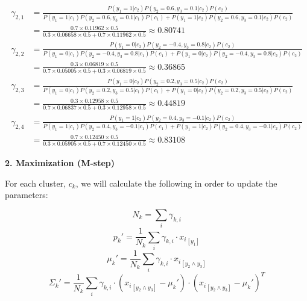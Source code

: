 \documentclass[12pt]{article}
\begin{document}
\begin{enumerate}[leftmargin=\labelsep]
          \vskip -0.5cm
          \begingroup
          \addtolength{\jot}{0.5em}
          \begin{align*}
              \gamma_{2,1} & = \frac{P(y_1=1|c_2)P(y_2=0.6,y_3=0.1|c_2)P(c_2)}{P(y_1=1|c_1)P(y_2=0.6,y_3=0.1|c_1)P(c_1) + P(y_1=1|c_2)P(y_2=0.6,y_3=0.1|c_2)P(c_2)} \\
                           & = \frac{0.7 \times 0.11962 \times 0.5}{0.3 \times 0.06658 \times 0.5 + 0.7 \times 0.11962 \times 0.5} \approx 0.80741 \\
              \gamma_{2,2} & = \frac{P(y_1=0|c_2)P(y_2=-0.4,y_3=0.8|c_2)P(c_2)}{P(y_1=0|c_1)P(y_2=-0.4,y_3=0.8|c_1)P(c_1) + P(y_1=0|c_2)P(y_2=-0.4,y_3=0.8|c_2)P(c_2)} \\
                           & = \frac{0.3 \times 0.06819 \times 0.5}{0.7 \times 0.05005 \times 0.5 + 0.3 \times 0.06819 \times 0.5} \approx 0.36865 \\
              \gamma_{2,3} & = \frac{P(y_1=0|c_2)P(y_2=0.2,y_3=0.5|c_2)P(c_2)}{P(y_1=0|c_1)P(y_2=0.2,y_3=0.5|c_1)P(c_1) + P(y_1=0|c_2)P(y_2=0.2,y_3=0.5|c_2)P(c_2)} \\
                           & = \frac{0.3 \times 0.12958 \times 0.5}{0.7 \times 0.06837 \times 0.5 + 0.3 \times 0.12958 \times 0.5} \approx 0.44819 \\
              \gamma_{2,4} & = \frac{P(y_1=1|c_2)P(y_2=0.4,y_3=-0.1|c_2)P(c_2)}{P(y_1=1|c_1)P(y_2=0.4,y_3=-0.1|c_1)P(c_1) + P(y_1=1|c_2)P(y_2=0.4,y_3=-0.1|c_2)P(c_2)} \\
                           & = \frac{0.7 \times 0.12450 \times 0.5}{0.3 \times 0.05905 \times 0.5 + 0.7 \times 0.12450 \times 0.5} \approx 0.83108
          \end{align*}
          \endgroup

          \vskip 0.2cm
          \begin{large}\textbf{2. Maximization (M-step)}\end{large}
          \vskip 0.1cm

          For each cluster, $c_k$, we will calculate the following in order to update the parameters:

          \begin{equation*}
              N_k = \sum_i \gamma_{k,i}
          \end{equation*}
          \begin{equation*}
              p_k' = \frac{1}{N_k} \sum_{i} \gamma_{k,i} \cdot {x_i}_{[y_1]}
          \end{equation*}
          \begin{equation*}
              \mu_k' = \frac{1}{N_k} \sum_{i} \gamma_{k,i} \cdot {x_i}_{[y_2 \land y_3]}
          \end{equation*}
          \begin{equation*}
              \Sigma_k' = \frac{1}{N_k} \sum_{i} \gamma_{k,i} \cdot \left({x_i}_{[y_2 \land y_3]} - \mu_k'\right) \cdot ({x_i}_{[y_2 \land y_3]} - \mu_k')^T
          \end{equation*}


\end{enumerate}
\end{document}

